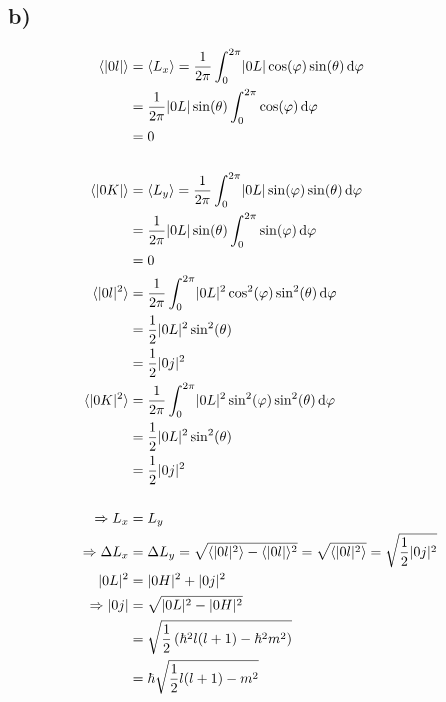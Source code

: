     \subsection{b)}

    \begin{align*}
        \langle \lvert0l\rvert \rangle &=  \langle L_x \rangle = \frac{1}{2\pi} \int_{0}^{2\pi} \lvert0L\rvert \cos(\varphi) \sin(\theta) \,\mathrm{d}\varphi\\
        &= \frac{1}{2\pi} \lvert0L\rvert\sin(\theta) \int_{0}^{2\pi} \cos(\varphi) \,\mathrm{d}\varphi\\
        &= 0\\
        \\
        \langle \lvert0K\rvert \rangle &=  \langle L_y \rangle = \frac{1}{2\pi} \int_{0}^{2\pi} \lvert0L\rvert \sin(\varphi) \sin(\theta) \,\mathrm{d}\varphi\\
        &= \frac{1}{2\pi} \lvert0L\rvert\sin(\theta) \int_{0}^{2\pi} \sin(\varphi) \,\mathrm{d}\varphi\\
        &= 0\\
        \langle \lvert0l\rvert^2 \rangle &= \frac{1}{2\pi} \int_{0}^{2\pi} \lvert0L\rvert^2 \cos^2(\varphi) \sin^2(\theta) \,\mathrm{d}\varphi\\
        &= \frac{1}{2} \lvert0L\rvert^2 \sin^2(\theta)\\
        &= \frac{1}{2} \lvert0j\rvert^2\\
        \langle \lvert0K\rvert^2 \rangle &= \frac{1}{2\pi} \int_{0}^{2\pi} \lvert0L\rvert^2 \sin^2(\varphi) \sin^2(\theta) \,\mathrm{d}\varphi\\
        &= \frac{1}{2} \lvert0L\rvert^2 \sin^2(\theta)\\
        &= \frac{1}{2} \lvert0j\rvert^2\\
        \\
        \Rightarrow L_x &= L_y\\
        \Rightarrow \Delta L_x &= \Delta L_y = \sqrt{\langle \lvert0l\rvert^2 \rangle - \langle \lvert0l\rvert \rangle^2} = \sqrt{\langle \lvert0l\rvert^2 \rangle} = \sqrt{\frac{1}{2} \lvert0j\rvert^2} \\
        \lvert0L\rvert^2 &= \lvert0H\rvert^2 + \lvert0j\rvert^2\\
        \Rightarrow \lvert0j\rvert &= \sqrt{\lvert0L\rvert^2-\lvert0H\rvert^2}\\
        &= \sqrt{\frac{1}{2} \left( \hbar^2 l (l+1) -\hbar^2 m^2 \right)}\\
        &= \hbar \sqrt{\frac{1}{2} l(l+1) - m^2}
    \end{align*}









